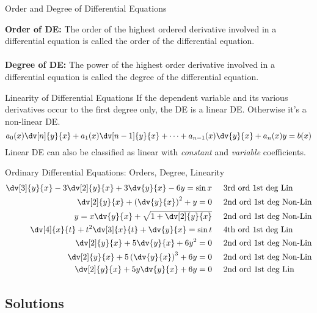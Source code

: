 \begin{definition}{Order and Degree of Differential Equations}{}
    
    \textbf{Order of DE:} The order of the highest ordered derivative involved in a differential equation is called the order of the differential equation. \\~\\
    \textbf{Degree of DE:} The power of the highest order derivative involved in a differential equation is called the degree of the differential equation.
\end{definition}

\begin{definition}{Linearity of Differential Equations}{}
    If the dependent variable  and its various derivatives occur to the first degree only, the DE is a linear DE. Otherwise it's a non-linear DE. \[
        a_0(x)\dv[n]{y}{x} + a_1(x)\dv[n-1]{y}{x} + \cdots + a_{n-1}(x)\dv{y}{x} + a_n(x)y = b(x)
    \] Linear DE can also be classified as linear with \textit{constant} and \textit{variable} coefficients.
\end{definition}

\begin{example}{Ordinary Differential Equations: Orders, Degree, Linearity}{}
    \begin{align*}
        \dv[3]{y}{x} - 3\dv[2]{y}{x} + 3\dv{y}{x} - 6y = \sin{x} &\text\;\;\;\;\;\text{3rd ord 1st deg Lin} \\
        \dv[2]{y}{x} + \left( \dv{y}{x} \right)^2 + y = 0 &\text\;\;\;\;\;\text{2nd ord 1st deg Non-Lin} \\
        y = x\dv{y}{x} + \sqrt{1 + \dv[2]{y}{x} } &\text\;\;\;\;\;\text{2nd ord 1st deg Non-Lin} \\
        \dv[4]{x}{t} + t^2\dv[3]{x}{t} + \dv{y}{x} = \sin{t} &\text\;\;\;\;\;\text{4th ord 1st deg Lin} \\
        \dv[2]{y}{x} + 5\dv{y}{x} + 6y^2 = 0 &\text\;\;\;\;\;\text{2nd ord 1st deg Non-Lin} \\
        \dv[2]{y}{x} + 5 \left( \dv{y}{x} \right)^3 + 6y = 0 &\text\;\;\;\;\;\text{2nd ord 1st deg Non-Lin} \\
        \dv[2]{y}{x} + 5y\dv{y}{x} + 6y = 0 &\text\;\;\;\;\;\text{2nd ord 1st deg Lin}
    \end{align*}
\end{example}



\subsection{Solutions}

